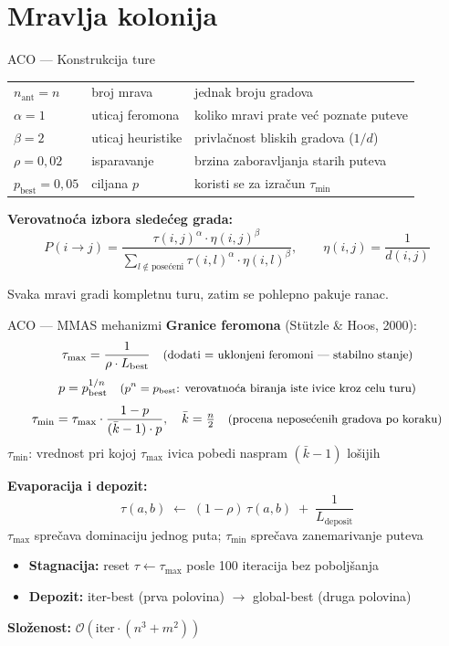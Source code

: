 \documentclass[aspectratio=169]{beamer}
\begin{document}
\section{Mravlja kolonija}

\begin{frame}{ACO --- Konstrukcija ture}
  \begin{tabular}{lll}
    $n_{\text{ant}} = n$    & broj mrava         & jednak broju gradova \\
    $\alpha = 1$            & uticaj feromona    & koliko mravi prate već poznate puteve \\
    $\beta = 2$             & uticaj heuristike  & privlačnost bliskih gradova ($1/d$) \\
    $\rho = 0{,}02$         & isparavanje        & brzina zaboravljanja starih puteva \\
    $p_{\text{best}} = 0{,}05$ & ciljana $p$     & koristi se za izračun $\tau_{\min}$ \\
  \end{tabular}

  \medskip
  \textbf{Verovatnoća izbora sledećeg grada:}
  \[
    P(i \to j) = \frac{\tau(i,j)^\alpha \cdot \eta(i,j)^\beta}
                       {\displaystyle\sum_{l \notin \text{posećeni}} \tau(i,l)^\alpha \cdot \eta(i,l)^\beta},
    \qquad \eta(i,j) = \frac{1}{d(i,j)}
  \]

  \bigskip
  Svaka mravi gradi kompletnu turu, zatim se pohlepno pakuje ranac.
\end{frame}

\begin{frame}{ACO --- MMAS mehanizmi}
  \textbf{Granice feromona} (Stützle \& Hoos, 2000):
  \[
    \tau_{\max} = \frac{1}{\rho \cdot L_{\text{best}}}
    \quad \text{\small(dodati = uklonjeni feromoni --- stabilno stanje)}
  \]
  \[
    p = p_{\text{best}}^{1/n}
    \quad \text{\small($p^n = p_{\text{best}}$: verovatnoća biranja iste ivice kroz celu turu)}
  \]
  \[
    \tau_{\min} = \tau_{\max} \cdot \frac{1-p}{(\bar{k}-1)\cdot p},
    \quad \bar{k} = \tfrac{n}{2}
    \quad \text{\small(procena neposećenih gradova po koraku)}
  \]
  {\small $\tau_{\min}$: vrednost pri kojoj $\tau_{\max}$ ivica pobedi naspram $(\bar{k}-1)$ lošijih}

  \medskip
  \textbf{Evaporacija i depozit:}
  \[
    \tau(a,b) \;\leftarrow\; (1-\rho)\,\tau(a,b) \;+\; \frac{1}{L_{\text{deposit}}}
  \]
  {\small $\tau_{\max}$ sprečava dominaciju jednog puta; $\tau_{\min}$ sprečava zanemarivanje puteva}

  \medskip
  \begin{itemize}
    \item \textbf{Stagnacija:} reset $\tau \leftarrow \tau_{\max}$ posle 100 iteracija bez poboljšanja
    \item \textbf{Depozit:} iter-best (prva polovina) $\to$ global-best (druga polovina)
  \end{itemize}

  \textbf{Složenost:} $\mathcal{O}(\text{iter} \cdot (n^3 + m^2))$
\end{frame}
\end{document}
